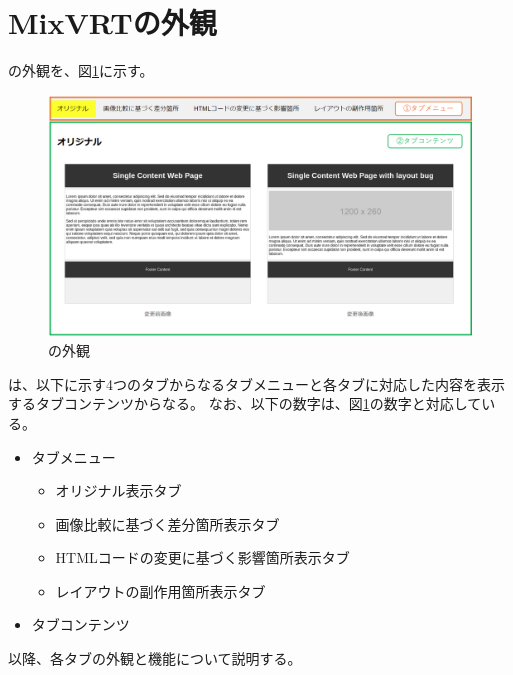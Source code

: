 \section{MixVRTの外観}
\toolName の外観を、図\ref{fig: Appearance}に示す。
\begin{figure}[tp]
    \begin{center}
        \includegraphics[width=1.0\columnwidth]{image/3_Appearance.png}
        \caption{\toolName の外観}
        \label{fig: Appearance}
    \end{center}
\end{figure}
\toolName は、以下に示す4つのタブからなるタブメニューと各タブに対応した内容を表示するタブコンテンツからなる。
なお、以下の数字は、図\ref{fig: Appearance}の数字と対応している。
\begin{itemize}
    \item[①] タブメニュー
          \begin{itemize}
              \item オリジナル表示タブ
              \item 画像比較に基づく差分箇所表示タブ
              \item HTMLコードの変更に基づく影響箇所表示タブ
              \item レイアウトの副作用箇所表示タブ
          \end{itemize}
    \item[②] タブコンテンツ
\end{itemize}
\par
以降、各タブの外観と機能について説明する。



